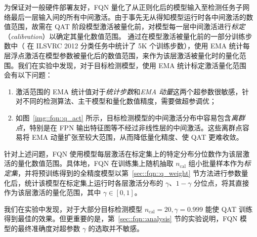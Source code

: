 \documentclass[
  fontset = mac,
]{shtthesis}
\begin{document}
为保证对一般硬件部署友好，FQN 量化了从正则化后的模型输入至检测任务子网络最后一层输入间的所有中间激活。由于事先无从得知模型运行时各中间激活的数值范围，故需在 QAT 阶段模型激活被量化前，对模型每一层中间激活进行\emph{标定}（\emph{calibration}）以确定其量化数值范围。\citet{jacob2018quantization, krishnamoorthi2018quantizing} 通过在模型激活被量化前的一部分训练步数中（\citet{jacob2018quantization} 在 ILSVRC 2012 分类任务中统计了 5K 个训练步数），使用 EMA 统计每层浮点激活在模型参数被量化后的数值范围，来作为该层激活被量化时的量化范围。我们在实验中发现，对于目标检测模型，使用 EMA 统计标定激活量化范围会有以下问题：
\begin{enumerate}[1)]
  \item 激活范围的 EMA 统计值对于\emph{统计步数}和\emph{EMA 动量}这两个超参数很敏感，针对不同的检测算法、主干模型和量化数值精度，需要做超参调优；
  \item 如图~\ref{img::fqn::q_act} 所示，目标检测模型的中间激活分布中容易包含\emph{离群点}，特别是在 FPN 输出特征图等不经过非线性层的中间激活。这些离群点容易将 EMA 动量扩张至较大范围，从而降低量化精度、使 QAT 更难收敛。
\end{enumerate}

针对上述问题，FQN 使用模型每层激活在标定集上的特定分布分位数作为该层激活的量化数值范围。具体地，FQN 在训练集上随机抽取 $n_{\mathrm{cal}}$ 组小批量样本作为\emph{标定集}，并将预训练得到的全精度模型以第~\ref{sec::fqn::q_weight} 节方法进行参数量化后，统计该模型在标定集上运行时各层激活分布的 $\gamma$、$1-\gamma$ 分位点，将其直接作为该层激活的量化范围，其中 $\gamma \in [0, 1]$。

我们在实验中发现，对于大部分目标检测模型 $n_{\mathrm{cal}} = 20, \gamma = 0.999$ 能使 QAT 训练得到最佳的效果。但更重要的是，第~\ref{sec::fqn::analysis} 节的实验说明，FQN 模型的最终准确度对超参数 $\gamma$ 的选取并不敏感。
\end{document}
